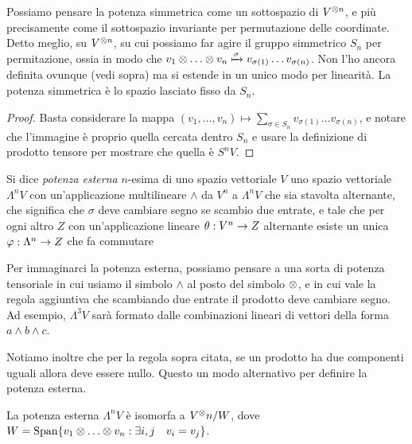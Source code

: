   \begin{myobs}
   Possiamo pensare la potenza simmetrica come un sottospazio di $V^{\otimes n}$, e più precisamente come il sottospazio invariante per permutazione delle coordinate. Detto meglio, su $V^{\otimes n}$, su cui possiamo far agire il gruppo simmetrico $S_n$ per permitazione, ossia in modo che $v_1 \tensor \dots \tensor v_n \xmapsto{\sigma} v_{\sigma(1)} \dots v_{\sigma(n)}$. Non l'ho ancora definita ovunque (vedi sopra) ma si estende in un unico modo per linearità. La potenza simmetrica è lo spazio lasciato fisso da $S_n$.
  \end{myobs}

  \begin{proof}
   Basta considerare la mappa $(v_1,\dots,v_n) \mapsto \sum_{\sigma \in S_n} v_{\sigma(1)} \dots v_{\sigma(n)}$, e notare che l'immagine è proprio quella cercata dentro $S_n$ e usare la definizione di prodotto tensore per mostrare che quella è $S^nV$.
  \end{proof}
  
  \begin{mydef}
   Si dice \emph{potenza esterna} $n$-esima di uno spazio vettoriale $V$ uno spazio vettoriale $\Lambda^nV$ con un'applicazione multilineare $\wedge$ da $V^n$ a $\Lambda^nV$ che sia stavolta alternante, che significa che $\sigma$ deve cambiare segno se scambio due entrate, e tale che per ogni altro $Z$ con un'applicazione lineare $\theta: V^n \rightarrow Z$ alternante esiste un unica $\varphi: \Lambda^n \rightarrow Z$ che fa commutare 
   
  
  \end{mydef}
    
  \begin{myobs}
   Per immaginarci la potenza esterna, possiamo pensare a una sorta di potenza tensoriale in cui usiamo il simbolo $\wedge$ al posto del simbolo $\otimes$, e in cui vale la regola aggiuntiva che scambiando due entrate il prodotto deve cambiare segno. Ad esempio, $\Lambda^3V$ sarà formato dalle combinazioni lineari di vettori della forma $a\wedge b \wedge c$. 
   
   Notiamo inoltre che per la regola sopra citata, se un prodotto ha due componenti uguali allora deve essere nullo. Questo  un modo alternativo per definire la potenza esterna.
  \end{myobs}
  
  \begin{myprop}
   La potenza esterna $\Lambda^nV$ è isomorfa a $V^\otimes n/W$, dove $W=\Span\{v_1 \tensor \dots \tensor v_n: \exists i,j\quad v_i=v_j\}$.
  \end{myprop}
